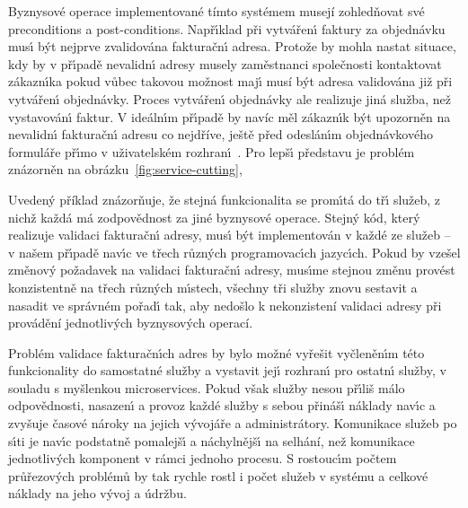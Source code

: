 Byznysové operace implementované tímto systémem musejí zohledňovat své preconditions a post-conditions.
Např\'{\i}klad při vytvářen\'{\i} faktury za objednávku mus\'{\i} b\'yt nejprve zvalidována fakturačn\'{\i} adresa.
Protože by mohla nastat situace, kdy by v př\'{\i}padě nevalidn\'{\i} adresy musely zaměstnanci společnosti kontaktovat zákazn\'{\i}ka
\textendash\xspace pokud vůbec takovou možnost maj\'{\i} \textendash\xspace  musí být adresa validována již při vytvářen\'{\i}
objednávky. Proces vytvářen\'{\i} objednávky ale realizuje jiná služba, než vystavován\'{\i} faktur.
V ideáln\'{\i}m př\'{\i}padě by navíc měl zákazn\'{\i}k být upozorněn na nevalidn\'{\i} fakturačn\'{\i}
adresu co nejdříve, ještě před odeslán\'{\i}m objednávkového formuláře př\'{\i}mo v uživatelském
rozhran\'{\i}~\cite{cemus2017separation}. Pro lepš\'{\i} představu je problém znázorněn na
obrázku~\ref{fig:service-cutting},

Uvedený příklad znázorňuje, že stejná funkcionalita se prom\'{\i}tá
do tř\'{\i} služeb, z nichž každá má zodpovědnost za jiné byznysové operace.
Stejn\'y kód, kter\'y realizuje validaci fakturačn\'{\i} adresy,
mus\'{\i} b\'yt implementován v každé ze služeb – v našem př\'{\i}padě nav\'{\i}c ve třech
různ\'ych programovac\'{\i}ch jazyc\'{\i}ch. Pokud by vzešel změnový požadavek
na validaci fakturačn\'{\i} adresy, mus\'{\i}me stejnou změnu
provést konzistentně na třech různ\'ych m\'{\i}stech, všechny tři služby znovu
sestavit a nasadit ve správném pořad\'{\i} tak, aby nedošlo k nekonzistení validaci adresy
při provádění jednotlivých byznysových operací.


Problém validace fakturačn\'{\i}ch adres by bylo možné vyřešit vyčleněn\'{\i}m této funkcionality
do samostatné služby a vystavit jej\'{\i} rozhran\'{\i} pro ostatn\'{\i} služby,
v souladu s myšlenkou microservices. Pokud však služby nesou př\'{\i}liš málo odpovědnosti,
nasazen\'{\i} a provoz každé služby s sebou přináš\'{\i} náklady nav\'{\i}c
a zvyšuje časové nároky na jejich v\'yvojáře a administrátory.
Komunikace služeb po s\'{\i}ti je nav\'{\i}c podstatně pomalejš\'{\i} a náchylnějš\'{\i} na
selhání, než komunikace jednotliv\'ych komponent v rámci jednoho procesu.
S rostouc\'{\i}m počtem průřezov\'ych problémů by tak rychle rostl
i počet služeb v systému a celkové náklady na jeho v\'yvoj a údržbu.

